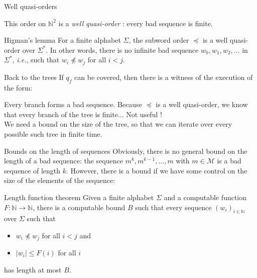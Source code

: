 \documentclass{beamer}
\newcommand{\messages}{\mathcal{M}}
\begin{document}
\begin{frame}{Well quasi-orders}
		 
		
		
		
		
		This order on $\mathbb{N}^2$ is a \emph{well quasi-order} : every bad sequence is finite.

			\begin{block}{Higman's lemma}
		For a finite alphabet $\Sigma$, the subword order $\preceq$ is a well quasi-order over $\Sigma^*$. In other words, there is no infinite bad sequence $w_0, w_1, w_2, \ldots$ in $\Sigma^*$, \emph{i.e.}, such that $w_i \npreceq w_j$ for all $i<j$.
	\end{block}
\end{frame}

\begin{frame}{Back to the trees}
If $q_f$ can be covered, then there is a witness of the execution of the form:
\begin{center}
\resizebox{!}{4cm}{

}
\end{center}

Every branch forms a bad sequence. Because $\preceq$ is a well quasi-order, we know that every branch of the tree is finite... 
\pause Not useful ! \\ We need a bound on the size of the tree, so that we can iterate over every possible such tree in finite time. 
\end{frame}

\begin{frame}{Bounds on the length of sequences}
	Obviously, there is no general bound on the length of a bad sequence: the sequence $m^k, m^{k-1}, \dots, m$ with $m \in \messages$ is a bad sequence of length $k$.  
	\pause
	However, there is a bound if we have some control on the size of the elements of the sequence:

	\begin{block}{Length function theorem\footnotemark}
	Given a finite alphabet $\Sigma$ and a computable function $F : \mathbb{N} \to \mathbb{N}$, there is a computable bound $B$ such that every sequence $(w_i)_{i \in \mathbb{N}}$ over $\Sigma$ such that
	\begin{itemize}
		\item $w_i \npreceq w_j$ for all $i<j$ and
		\item $|w_i| \leq F(i)$ for all $i$
	\end{itemize}
has length at most $B$.
\end{block}
\end{frame}
\end{document}
